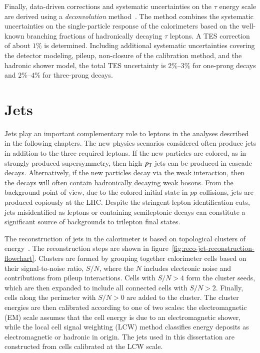 Finally, data-driven corrections and systematic uncertainties on the $\tau$ energy scale are derived using a \emph{deconvolution} method~\cite{TheATLASCollaboration:2011ks}. The method combines the systematic uncertainties on the single-particle response of the calorimeters based on the well-known branching fractions of hadronically decaying $\tau$ leptons. A TES correction of about $1\%$ is determined. Including additional systematic uncertainties covering the detector modeling, pileup, non-closure of the calibration method, and the hadronic shower model, the total TES uncertainty is $2\%$--$3\%$ for one-prong decays and $2\%$--$4\%$ for three-prong decays.

\section{Jets}\label{sec:reco-jets}
Jets play an important complementary role to leptons in the analyses described in the following chapters. The new physics scenarios considered often produce jets in addition to the three required leptons. If the new particles are colored, as in strongly produced supersymmetry, then high-$p_{\text{T}}$ jets can be produced in cascade decays. Alternatively, if the new particles decay via the weak interaction, then the decays will often contain hadronically decaying weak bosons. From the background point of view, due to the colored initial state in $pp$ collisions, jets are produced copiously at the LHC. Despite the stringent lepton identification cuts, jets misidentified as leptons or containing semileptonic decays can constitute a significant source of backgrounds to trilepton final states.

The reconstruction of jets in the calorimeter is based on topological clusters of energy~\cite{TheATLASCollaboration:2011ks,TheATLASCollaboration:2015ds}. The reconstruction steps are shown in figure~\ref{fig:reco-jet-reconstruction-flowchart}. Clusters are formed by grouping together calorimeter cells based on their signal-to-noise ratio, $S/N$, where the $N$ includes electronic noise and contributions from pileup interactions. Cells with $S/N>4$ form the cluster seeds, which are then expanded to include all connected cells with $S/N>2$. Finally, cells along the perimeter with $S/N>0$ are added to the cluster. The cluster energies are then calibrated according to one of two scales: the electromagnetic (EM) scale assumes that the cell energy is due to an electromagnetic shower, while the local cell signal weighting (LCW) method classifies energy deposits as electromagnetic or hadronic in origin. The jets used in this dissertation are constructed from cells calibrated at the LCW scale.


